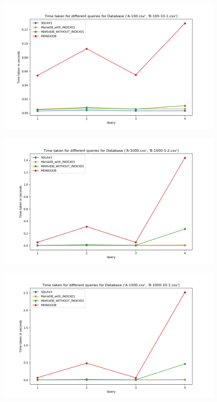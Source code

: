 \documentclass[12pt]{article}
\begin{document}
\begin{figure}[H]
  \centering
  \includegraphics[width=.95\linewidth]{db_qry_time/3.png}
\end{figure}

\begin{figure}[H]
  \centering
  \includegraphics[width=.95\linewidth]{db_qry_time/4.png}
\end{figure}
\begin{figure}[H]
  \centering
  \includegraphics[width=.95\linewidth]{db_qry_time/5.png}
\end{figure}
\end{document}
